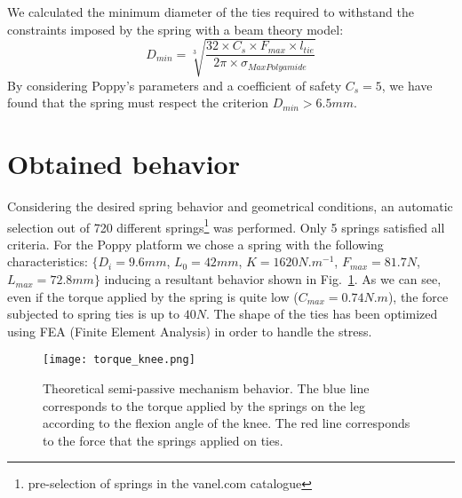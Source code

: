 We calculated the minimum diameter of the ties required to withstand the constraints imposed by the spring with a beam theory model:
\begin{equation}
    D_{min}= \sqrt[3]{ \frac{32 \times  C_s \times F_{max} \times l_{tie}}{2 \pi \times \sigma_{MaxPolyamide}} }
\end{equation}
By considering Poppy's parameters and a coefficient of safety $C_s = 5$, we have found that the spring must respect the criterion $D_{min} > 6.5 mm$.

\section{Obtained behavior} %
\label{sub:obtained_behavior}

Considering the desired spring behavior and geometrical conditions, an automatic selection out of 720 different springs\footnote{pre-selection of springs in the vanel.com catalogue} was performed. Only 5 springs satisfied all criteria. For the Poppy platform we chose a spring with the following characteristics: $\{ D_i=9.6mm$, $L_0=42mm$, $K=1620N.m^{-1}$, $F_{max}=81.7 N$, $L_{max}=72.8 mm \}$ inducing a resultant behavior shown in Fig.~\ref{fig:knee_feature}. As we can see, even if the torque applied by the spring is quite low ($C_{max} = 0.74 N.m$), the force subjected to spring ties is up to $40N$. The shape of the ties has been optimized using FEA (Finite Element Analysis) in order to handle the stress.

\begin{figure}[h]
    \centering
    \texttt{[image: torque\_knee.png]}
    \caption{Theoretical semi-passive mechanism behavior. The blue line corresponds to the torque applied by the springs on the leg according to the flexion angle of the knee. The red line corresponds to the force that the springs applied on ties.}
    \label{fig:knee_feature}
\end{figure}
